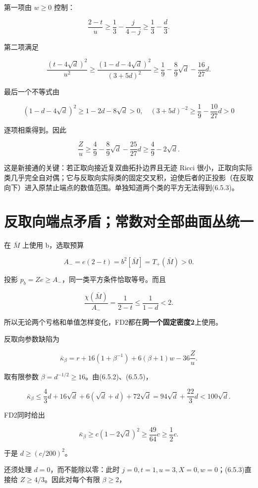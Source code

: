 \documentclass[UTF8,11pt,fontset=none]{ctexart}
\theoremstyle{definition}
\theoremstyle{remark}
\begin{document}
第一项由 \(w\ge0\) 控制：

\[
\frac{2-t}{u}\ge\frac13-\frac j{4-j}\ge\frac13-\frac d3.
\]

第二项满足

\[
\frac{(t-4\sqrt d)^2}{u^2}
\ge\frac{(1-d-4\sqrt d)^2}{(3+5d)^2}
\ge\frac19-\frac89\sqrt d-\frac{16}{27}d.
\]

最后一个不等式由

\[
(1-d-4\sqrt d)^2\ge1-2d-8\sqrt d>0,
\quad
(3+5d)^{-2}\ge\frac19-\frac{10}{27}d>0
\]

逐项相乘得到。因此

\[
\frac Zu\ge\frac49-\frac89\sqrt d-\frac{25}{27}d
\ge\boxed{\frac49-2\sqrt d.}
\tag{6.5.5}
\]

这是新接通的关键：若正取向接近复双曲拓扑边界且无迹 Ricci 很小，正取向实际类几乎完全自对偶；它与反取向实际类的固定交叉积，迫使后者的正投影（在反取向下）进入原禁止端点的数值范围。单独知道两个类的平方无法得到(6.5.3)。

\section{反取向端点矛盾；常数对全部曲面丛统一}\label{v6-ux53cdux53d6ux5411ux7aefux70b9ux77dbux76feux5e38ux6570ux5bf9ux5168ux90e8ux66f2ux9762ux4e1bux7edfux4e00}

在 \(\bar M\) 上使用 b，选取预算

\[
A_-=e(2-t)=b^2[\bar M]=T_+(\bar M)>0.
\]

投影 \(p_b=Ze\ge A_-\)，同一类平方条件恰取等号。而且

\[
\frac{\chi(\bar M)}{A_-}=\frac1{2-t}
\le\frac1{1-d}<2.
\tag{6.6.1}
\]

所以无论两个亏格和单值怎样变化，FD2都在\textbf{同一个固定密度2}上使用。

反取向参数缺陷为

\[
\bar\kappa_\beta
=r+16(1+\beta^{-1})+6(\beta+1)w-36\frac Zu.
\tag{6.6.2}
\]

取有限参数 \(\beta=d^{-1/2}\ge16\)。由(6.5.2)、(6.5.5)，

\[
\bar\kappa_\beta
\le\frac43d+16\sqrt d+6(\sqrt d+d)+72\sqrt d
=94\sqrt d+\frac{22}{3}d
<100\sqrt d.
\tag{6.6.3}
\]

FD2同时给出

\[
\bar\kappa_\beta\ge c(1-2\sqrt d)^2
\ge\frac{49}{64}c\ge\frac12c.
\tag{6.6.4}
\]

于是 \(d\ge(c/200)^2\)。

还须处理 \(d=0\)，而不能除以零：此时 \(j=0,t=1,u=3,X=0,w=0\)；(6.5.3)直接给 \(Z\ge4/3\)。因此对每个有限 \(\beta\ge2\)，
\end{document}
